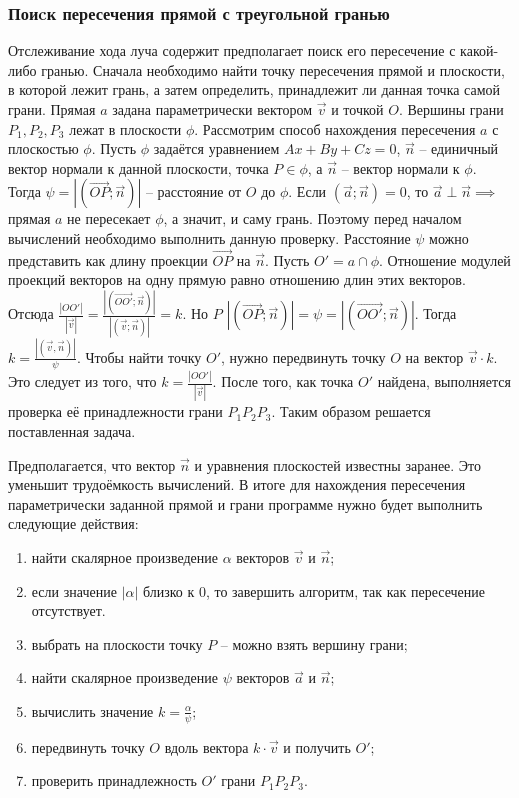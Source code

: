 {    \subsubsection{Поиcк пересечения прямой с треугольной гранью} {
        Отслеживание хода луча содержит предполагает поиск
        его пересечение с какой-либо гранью.
        Сначала необходимо найти точку пересечения прямой и плоскости,
        в которой лежит грань, а затем определить,
        принадлежит ли данная точка самой грани.
        Прямая $a$ задана параметрически вектором $\vec{v}$ и точкой $O$.
        Вершины грани $P_1, P_2, P_3$ лежат в плоскости $\phi$.
        Рассмотрим способ нахождения пересечения $a$ с плоскостью $\phi$.
        Пусть $\phi$ задаётся уравнением $Ax + By + Cz = 0$,
        $\vec{n}$ -- единичный вектор нормали к данной плоскости,
        точка $P \in \phi$, а $\vec{n}$ -- вектор нормали к $\phi$.
        Тогда $\psi = |(\vec{OP}; \vec{n})|$ -- расстояние от $O$ до $\phi$.
        Если $(\vec{a}; \vec{n}) = 0$, то $\vec{a} \perp \vec{n} \implies$
        прямая $a$ не пересекает $\phi$, а значит, и саму грань.
        Поэтому перед началом вычислений необходимо выполнить данную проверку.
        Расстояние $\psi$ можно представить как длину проекции
        $\vec{OP}$ на $\vec{n}$.
        Пусть $O' = a \cap \phi$.
        Отношение модулей проекций векторов на одну прямую равно
        отношению длин этих векторов.
        Отсюда $\frac{|OO'|}{|\vec{v}|}=
        \frac{|(\vec{OO'};\vec{n})|}{|(\vec{v};\vec{n})|} = k$.
        Но $P$ $|(\vec{OP}; \vec{n})| = \psi = |(\vec{OO'}; \vec{n})|$.
        Тогда $k = \frac{|(\vec{v}, \vec{n})|}{\psi}$.
        Чтобы найти точку $O'$, нужно передвинуть точку $O$ на вектор $\vec{v} \cdot k$.
        Это следует из того, что $k = \frac{|OO'|}{|\vec{v}|}$.
        После того, как точка $O'$ найдена, выполняется проверка
        её принадлежности грани $P_1P_2P_3$.
        Таким образом решается поставленная задача.

        Предполагается, что вектор $\vec{n}$ и уравнения плоскостей известны заранее.
        Это уменьшит трудоёмкость вычислений.
        В итоге для нахождения пересечения параметрически заданной прямой и
        грани программе нужно будет выполнить следующие действия:
        \begin{enumerate}
            \item найти скалярное произведение $\alpha$ векторов $\vec{v}$ и $\vec{n}$;
            \item если значение $|\alpha|$ близко к 0, то завершить алгоритм, так как пересечение отсутствует.
            \item выбрать на плоскости точку $P$ -- можно взять вершину грани;
            \item найти скалярное произведение $\psi$ векторов $\vec{a}$ и $\vec{n}$;
            \item вычислить значение $k = \frac{\alpha}{\psi}$;
            \item передвинуть точку $O$ вдоль вектора $k \cdot \vec{v}$ и получить $O'$;
            \item проверить принадлежность $O'$ грани $P_1P_2P_3$.
        \end{enumerate}
    }
}
